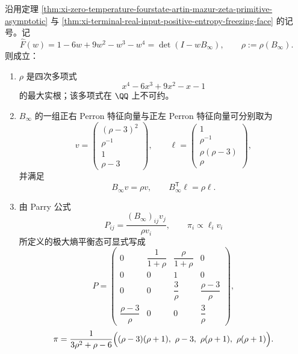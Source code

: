 \begin{theorem}\label{thm:xi-zero-temperature-fourstate-perron-parry-closed-form}
沿用定理 \ref{thm:xi-zero-temperature-fourstate-artin-mazur-zeta-primitive-asymptotic} 与
\ref{thm:xi-terminal-real-input-positive-entropy-freezing-face} 的记号。记
\[
\widehat F(w)=1-6w+9w^2-w^3-w^4=\det(I-wB_\infty),
\qquad
\rho:=\rho(B_\infty).
\]
则成立：
\begin{enumerate}
  \item \(\rho\) 是四次多项式
  \[
  x^4-6x^3+9x^2-x-1
  \]
  的最大实根；该多项式在 \(\QQ\) 上不可约。
  \item \(B_\infty\) 的一组正右 Perron 特征向量与正左 Perron 特征向量可分别取为
  \[
  v=
  \begin{pmatrix}
  (\rho-3)^2\\
  \rho^{-1}\\
  1\\
  \rho-3
  \end{pmatrix},
  \qquad
  \ell=
  \begin{pmatrix}
  1\\
  \rho^{-1}\\
  \rho(\rho-3)\\
  \rho
  \end{pmatrix},
  \]
  并满足
  \[
  B_\infty v=\rho v,
  \qquad
  B_\infty^{\mathsf T}\ell=\rho\ell.
  \]
  \item 由 Parry 公式
  \[
  P_{ij}=\frac{(B_\infty)_{ij}v_j}{\rho v_i},
  \qquad
  \pi_i\propto \ell_i v_i
  \]
  所定义的极大熵平衡态可显式写成
  \[
  P=
  \begin{pmatrix}
  0 & \dfrac{1}{1+\rho} & \dfrac{\rho}{1+\rho} & 0\\[2mm]
  0 & 0 & 1 & 0\\[2mm]
  0 & 0 & \dfrac{3}{\rho} & \dfrac{\rho-3}{\rho}\\[2mm]
  \dfrac{\rho-3}{\rho} & 0 & 0 & \dfrac{3}{\rho}
  \end{pmatrix},
  \]
  \[
  \pi=
  \frac{1}{3\rho^2+\rho-6}
  \Bigl((\rho-3)(\rho+1),\ \rho-3,\ \rho(\rho+1),\ \rho(\rho+1)\Bigr).
  \]
\end{enumerate}
\end{theorem}
